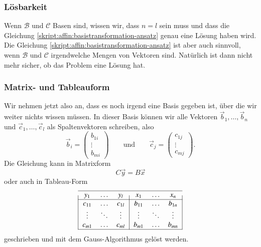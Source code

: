 \subsubsection{Lösbarkeit}
Wenn $\mathcal{B}$ und $\mathcal{C}$ Basen sind, wissen wir, dass
$n=l$ sein muss und dass die Gleichung
\eqref{skript:affin:basistransformation-ansatz}
genau eine Lösung haben wird.
Die Gleichung
\eqref{skript:affin:basistransformation-ansatz}
ist aber auch sinnvoll, wenn $\mathcal{B}$ und $\mathcal{C}$ irgendwelche
Mengen von Vektoren sind.
Natürlich ist dann nicht mehr sicher, ob das Problem eine Lösung hat.

\subsubsection{Matrix- und Tableauform}
Wir nehmen jetzt also an, dass es noch irgend eine Basis gegeben ist,
über die wir weiter nichts wissen müssen.
In dieser Basis können wir alle Vektoren
$\vec{b}_1,\dots,\vec{b}_n$ und $\vec{c}_1,\dots,\vec{c}_l$
als Spaltenvektoren schreiben, also
\[
\vec{b}_i = \begin{pmatrix}b_{1i}\\\vdots\\b_{mi}\end{pmatrix}
\qquad\text{und}\qquad
\vec{c}_j = \begin{pmatrix}c_{1j}\\\vdots\\c_{mj}\end{pmatrix}.
\]
Die Gleichung
\label{skript:affin:basistransformation-ansatz}
kann in Matrixform
\begin{equation}
C\vec{y} = B\vec{x}
\label{skript:affin:basistransformation-matrix}
\end{equation}
oder auch
in Tableau-Form
\begin{equation}
\begin{tabular}{|>{$}c<{$}>{$}c<{$}>{$}c<{$}|>{$}c<{$}>{$}c<{$}>{$}c<{$}|}
\hline
   y_1&\dots &   y_l&   x_1&\dots &   x_n\\
\hline
c_{11}&\dots &c_{1l}&b_{11}&\dots &b_{1n}\\
\vdots&\ddots&\vdots&\vdots&\ddots&\vdots\\
c_{m1}&\dots &c_{ml}&b_{m1}&\dots &b_{mn}\\
\hline
\end{tabular}
\label{skript:affin:basistransformation-tableau}
\end{equation}
geschrieben und mit dem Gauss-Algorithmus gelöst werden.

